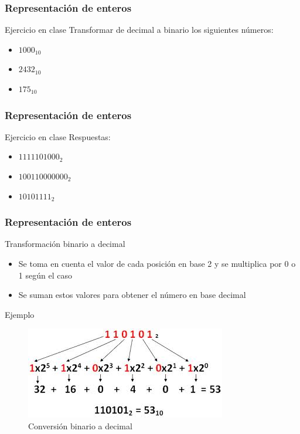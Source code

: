 \documentclass{beamer}
\begin{document}
\begin{frame}
	\frametitle{Representación de enteros}
	\begin{block}{Ejercicio en clase}
	Transformar de decimal a binario los siguientes números:
		\begin{itemize}
			\item $1000_{10}$
			\item $2432_{10}$
			\item $175_{10}$
		\end{itemize}
	\end{block}	
\end{frame}



\begin{frame}
	\frametitle{Representación de enteros}
	\begin{block}{Ejercicio en clase}
	Respuestas:
		\begin{itemize}
			\item $1111101000_{2}$
			\item $100110000000_{2}$
			\item $10101111_{2}$
		\end{itemize}
	\end{block}	
\end{frame}

\begin{frame}
	\frametitle{Representación de enteros}
	\begin{block}{Transformación binario a decimal}
		\begin{itemize}
			\item Se toma en cuenta el valor de cada posición en base 2 y se multiplica por 0 o 1 según el caso
			\item Se suman estos valores para obtener el número en base decimal
		\end{itemize}
	\end{block}	
	\begin{exampleblock}{Ejemplo}
	\vspace{-0.3cm}
		\begin{figure}[H]
			\centering
			\includegraphics[scale=0.5]{imagenes/pasar-decimal-binario.jpg}
			\caption{Conversión binario a decimal}
			\end{figure}		
	\end{exampleblock}
\end{frame}
\end{document}
